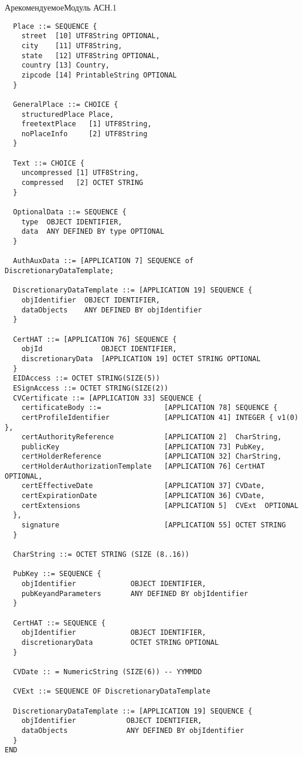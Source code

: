 \begin{appendix}{А}{рекомендуемое}{Модуль АСН.1}
\begin{verbatim}
  Place ::= SEQUENCE {
    street  [10] UTF8String OPTIONAL,
    city    [11] UTF8String,
    state   [12] UTF8String OPTIONAL,
    country [13] Country,
    zipcode [14] PrintableString OPTIONAL
  }
  
  GeneralPlace ::= CHOICE {
    structuredPlace Place,
    freetextPlace   [1] UTF8String,
    noPlaceInfo     [2] UTF8String
  }
  
  Text ::= CHOICE {
    uncompressed [1] UTF8String,
    compressed   [2] OCTET STRING
  }
  
  OptionalData ::= SEQUENCE {
    type  OBJECT IDENTIFIER,
    data  ANY DEFINED BY type OPTIONAL
  }

  AuthAuxData ::= [APPLICATION 7] SEQUENCE of DiscretionaryDataTemplate;

  DiscretionaryDataTemplate ::= [APPLICATION 19] SEQUENCE {
    objIdentifier  OBJECT IDENTIFIER,
    dataObjects    ANY DEFINED BY objIdentifier
  }

  CertHAT ::= [APPLICATION 76] SEQUENCE {
    objId              OBJECT IDENTIFIER,
    discretionaryData  [APPLICATION 19] OCTET STRING OPTIONAL
  }
  EIDAccess ::= OCTET STRING(SIZE(5))
  ESignAccess ::= OCTET STRING(SIZE(2))
  CVCertificate ::= [APPLICATION 33] SEQUENCE {
    certificateBody ::=               [APPLICATION 78] SEQUENCE {
    certProfileIdentifier             [APPLICATION 41] INTEGER { v1(0) },
    certAuthorityReference            [APPLICATION 2]  CharString,
    publicKey                         [APPLICATION 73] PubKey,
    certHolderReference               [APPLICATION 32] CharString,
    certHolderAuthorizationTemplate   [APPLICATION 76] CertHAT  OPTIONAL,
    certEffectiveDate                 [APPLICATION 37] CVDate,
    certExpirationDate                [APPLICATION 36] CVDate,
    certExtensions                    [APPLICATION 5]  CVExt  OPTIONAL
  },
    signature                         [APPLICATION 55] OCTET STRING
  }

  CharString ::= OCTET STRING (SIZE (8..16))

  PubKey ::= SEQUENCE {
    objIdentifier             OBJECT IDENTIFIER,
    pubKeyandParameters       ANY DEFINED BY objIdentifier 
  }

  CertHAT ::= SEQUENCE {
    objIdentifier             OBJECT IDENTIFIER,
    discretionaryData         OCTET STRING OPTIONAL
  }

  CVDate :: = NumericString (SIZE(6)) -- YYMMDD

  CVExt ::= SEQUENCE OF DiscretionaryDataTemplate

  DiscretionaryDataTemplate ::= [APPLICATION 19] SEQUENCE {
    objIdentifier            OBJECT IDENTIFIER,
    dataObjects              ANY DEFINED BY objIdentifier
  }
END
\end{verbatim}

\end{appendix}
